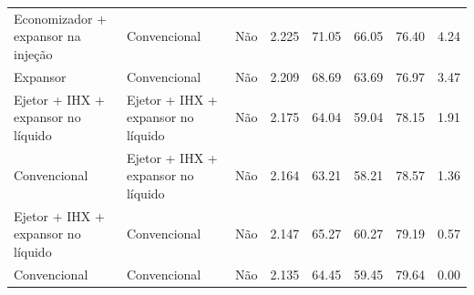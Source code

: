 {\begin{tabular}{llcrrrrr}
Economizador + expansor na injeção & Convencional & Não & 2.225 & 71.05 & 66.05 & 76.40 & 4.24 \\
Expansor & Convencional & Não & 2.209 & 68.69 & 63.69 & 76.97 & 3.47 \\
Ejetor + IHX + expansor no líquido & Ejetor + IHX + expansor no líquido & Não & 2.175 & 64.04 & 59.04 & 78.15 & 1.91 \\
Convencional & Ejetor + IHX + expansor no líquido & Não & 2.164 & 63.21 & 58.21 & 78.57 & 1.36 \\
Ejetor + IHX + expansor no líquido & Convencional & Não & 2.147 & 65.27 & 60.27 & 79.19 & 0.57 \\
Convencional & Convencional & Não & 2.135 & 64.45 & 59.45 & 79.64 & 0.00 \\
\bottomrule
\end{tabular}
}
